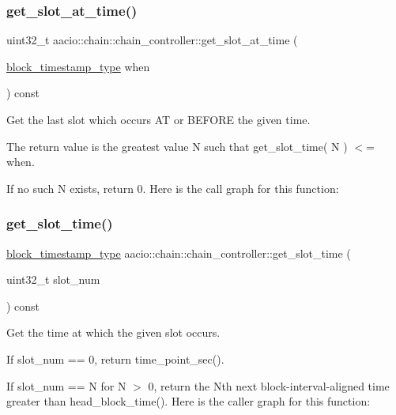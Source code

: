 \subsubsection{\texorpdfstring{get\+\_\+slot\+\_\+at\+\_\+time()}{get\_slot\_at\_time()}}
{\footnotesize\ttfamily uint32\+\_\+t aacio\+::chain\+::chain\+\_\+controller\+::get\+\_\+slot\+\_\+at\+\_\+time (\begin{DoxyParamCaption}\item[{\mbox{\hyperlink{classaacio_1_1chain_1_1block__timestamp}{block\+\_\+timestamp\+\_\+type}}}]{when }\end{DoxyParamCaption}) const}

Get the last slot which occurs AT or B\+E\+F\+O\+RE the given time.

The return value is the greatest value N such that get\+\_\+slot\+\_\+time( N ) $<$= when.

If no such N exists, return 0. Here is the call graph for this function\+:
\mbox{\label{classaacio_1_1chain_1_1chain__controller_a16c358c4d8477b5c7f4cedbde3faa235}} 
\subsubsection{\texorpdfstring{get\+\_\+slot\+\_\+time()}{get\_slot\_time()}}
{\footnotesize\ttfamily \mbox{\hyperlink{classaacio_1_1chain_1_1block__timestamp}{block\+\_\+timestamp\+\_\+type}} aacio\+::chain\+::chain\+\_\+controller\+::get\+\_\+slot\+\_\+time (\begin{DoxyParamCaption}\item[{uint32\+\_\+t}]{slot\+\_\+num }\end{DoxyParamCaption}) const}

Get the time at which the given slot occurs.

If slot\+\_\+num == 0, return time\+\_\+point\+\_\+sec().

If slot\+\_\+num == N for N $>$ 0, return the Nth next block-\/interval-\/aligned time greater than head\+\_\+block\+\_\+time(). Here is the caller graph for this function\+:
\mbox{\label{classaacio_1_1chain_1_1chain__controller_a6bbdca183ddca90d147fc95e1d27cfed}} 
